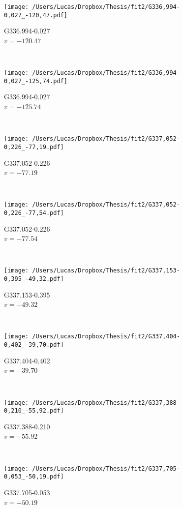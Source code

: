 \begin{figure*}[t]\ContinuedFloat
	\centering
	\begin{subfigure}[t]{0.3\textwidth}
		\texttt{[image: /Users/Lucas/Dropbox/Thesis/fit2/G336,994-0,027\_-120,47.pdf]}
		\caption[]{G336.994-0.027\\$v=-120.47$\,\kms}
	\end{subfigure}
	~
	\begin{subfigure}[t]{0.3\textwidth}
		\texttt{[image: /Users/Lucas/Dropbox/Thesis/fit2/G336,994-0,027\_-125,74.pdf]}
		\caption[]{G336.994-0.027\\$v=-125.74$\,\kms}
	\end{subfigure}
	~
	\begin{subfigure}[t]{0.3\textwidth}
		\texttt{[image: /Users/Lucas/Dropbox/Thesis/fit2/G337,052-0,226\_-77,19.pdf]}
		\caption[]{G337.052-0.226\\$v=-77.19$\,\kms}
	\end{subfigure}
	~
	\begin{subfigure}[t]{0.3\textwidth}
		\texttt{[image: /Users/Lucas/Dropbox/Thesis/fit2/G337,052-0,226\_-77,54.pdf]}
		\caption[]{G337.052-0.226\\$v=-77.54$\,\kms}
	\end{subfigure}
	~
	\begin{subfigure}[t]{0.3\textwidth}
		\texttt{[image: /Users/Lucas/Dropbox/Thesis/fit2/G337,153-0,395\_-49,32.pdf]}
		\caption[]{G337.153-0.395\\$v=-49.32$\,\kms}
	\end{subfigure}
	~
	\begin{subfigure}[t]{0.3\textwidth}
		\texttt{[image: /Users/Lucas/Dropbox/Thesis/fit2/G337,404-0,402\_-39,70.pdf]}
		\caption[]{G337.404-0.402\\$v=-39.70$\,\kms}
	\end{subfigure}
	~
	\begin{subfigure}[t]{0.3\textwidth}
		\texttt{[image: /Users/Lucas/Dropbox/Thesis/fit2/G337,388-0,210\_-55,92.pdf]}
		\caption[]{G337.388-0.210\\$v=-55.92$\,\kms}
	\end{subfigure}
	~
	\begin{subfigure}[t]{0.3\textwidth}
		\texttt{[image: /Users/Lucas/Dropbox/Thesis/fit2/G337,705-0,053\_-50,19.pdf]}
		\caption[]{G337.705-0.053\\$v=-50.19$\,\kms}

\end{subfigure}
\end{figure*}
